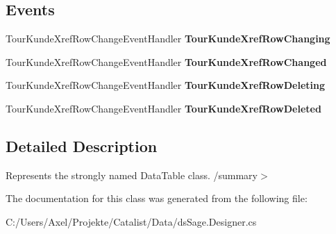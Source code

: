 \subsection*{Events}
\begin{DoxyCompactItemize}
\item 
Tour\+Kunde\+Xref\+Row\+Change\+Event\+Handler {\bfseries Tour\+Kunde\+Xref\+Row\+Changing}\hypertarget{class_products_1_1_data_1_1ds_sage_1_1_tour_kunde_xref_data_table_a901634dc7ad987d9d7032bab66a61c41}{}\label{class_products_1_1_data_1_1ds_sage_1_1_tour_kunde_xref_data_table_a901634dc7ad987d9d7032bab66a61c41}

\item 
Tour\+Kunde\+Xref\+Row\+Change\+Event\+Handler {\bfseries Tour\+Kunde\+Xref\+Row\+Changed}\hypertarget{class_products_1_1_data_1_1ds_sage_1_1_tour_kunde_xref_data_table_a0845d86c3ba6fdd66ba6cfd1116c8922}{}\label{class_products_1_1_data_1_1ds_sage_1_1_tour_kunde_xref_data_table_a0845d86c3ba6fdd66ba6cfd1116c8922}

\item 
Tour\+Kunde\+Xref\+Row\+Change\+Event\+Handler {\bfseries Tour\+Kunde\+Xref\+Row\+Deleting}\hypertarget{class_products_1_1_data_1_1ds_sage_1_1_tour_kunde_xref_data_table_acd0d4cacdc81117ab972b67d3569047d}{}\label{class_products_1_1_data_1_1ds_sage_1_1_tour_kunde_xref_data_table_acd0d4cacdc81117ab972b67d3569047d}

\item 
Tour\+Kunde\+Xref\+Row\+Change\+Event\+Handler {\bfseries Tour\+Kunde\+Xref\+Row\+Deleted}\hypertarget{class_products_1_1_data_1_1ds_sage_1_1_tour_kunde_xref_data_table_a016a6ea0d6aabcbe46daf5b68f8a9525}{}\label{class_products_1_1_data_1_1ds_sage_1_1_tour_kunde_xref_data_table_a016a6ea0d6aabcbe46daf5b68f8a9525}

\end{DoxyCompactItemize}


\subsection{Detailed Description}
Represents the strongly named Data\+Table class. /summary$>$ 

The documentation for this class was generated from the following file\+:\begin{DoxyCompactItemize}
\item 
C\+:/\+Users/\+Axel/\+Projekte/\+Catalist/\+Data/ds\+Sage.\+Designer.\+cs\end{DoxyCompactItemize}
